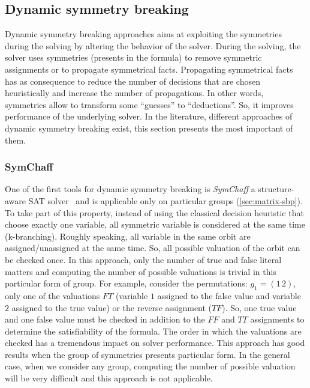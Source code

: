 %
%
%
%

% 

\subsection{Dynamic symmetry breaking}

Dynamic symmetry breaking approaches aims at exploiting the symmetries during the solving by altering the behavior of the solver.
During the solving, the solver uses symmetries (presents in the formula) to remove symmetric assignments or to propagate symmetrical facts.
Propagating symmetrical facts has as consequence to reduce the number of decisions that are chosen heuristically and increase the number of propagations.
In other words, symmetries allow to transform some “guesses” to “deductions”. So, it improves performance of the underlying solver.
In the literature, different approaches of dynamic symmetry breaking exist, this section presents the most important of them.

\subsubsection{SymChaff}
One of the first tools for dynamic symmetry breaking is \emph{SymChaff} a structure-aware SAT solver~\cite{sabharwal2005symchaff}
and is applicable only on particular groups (\cref{sec:matrix-sbp}).
To take part of this property, instead of using the classical decision heuristic that choose exactly one
variable, all symmetric variable is considered at the same time (k-branching). 
Roughly speaking,
all variable in the same orbit are assigned/unassigned at the same time. So, all possible valuation 
of the orbit can be checked once. In this approach, only the number of true and false literal matters
and computing the number of possible valuations is trivial in this particular 
form of group. For example, consider the permutations: $g_1 = (1\, 2)$,
only one of the valuations $F T$ (variable $1$ assigned to the false value and variable $2$ assigned to the true value) or the reverse assignment ($T F$).
 So, one true value and one false value must be checked in addition to the 
$F F$ and $T T$ assignments to determine the satisfiability of the formula.
 The order in which the valuations are checked has a tremendous impact on solver performance. 
This approach has good results when the group of symmetries presents particular form.
In the general case, when we consider any group, computing the number of possible valuation will be very difficult and this approach is not applicable.

